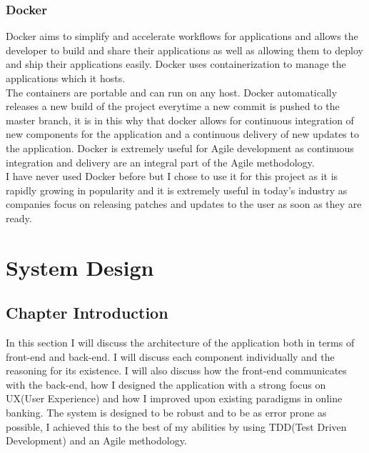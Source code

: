 \subsection{Docker}
Docker aims to simplify and accelerate workflows for applications and allows the developer to build and share their applications as well as allowing them to deploy and ship their applications easily\cite{Docker}.  Docker uses containerization to manage the applications which it hosts.
\\
 The containers are portable and can run on any host.  Docker automatically releases a new build of the project everytime a new commit is pushed to the master branch, it is in this why that docker allows for continuous integration of new components for the application and a continuous delivery of new updates to the application.  Docker is extremely useful for Agile development as continuous integration and delivery are an integral part of the Agile methodology.
\\
  I have never used Docker before but I chose to use it for this project as it is rapidly growing in popularity and it is extremely useful in today's industry as companies focus on releasing patches and updates to the user as soon as they are ready.
\chapter{System Design}
\section{Chapter Introduction}
In this section I will discuss the architecture of the application both in terms of front-end and back-end.
I will discuss each component individually and the reasoning for its existence.  I will also discuss how
the front-end communicates with the back-end, how I designed the application with a strong focus on UX(User Experience)
and how I improved upon existing paradigms in online banking.  The system is designed to be robust and to be as
error prone as possible, I achieved this to the best of my abilities by using TDD(Test Driven Development) and an
Agile methodology.

